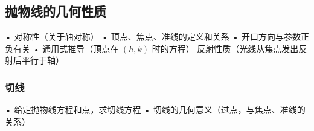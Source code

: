 \subsection{抛物线的几何性质}
	•	对称性（关于轴对称）
	•	顶点、焦点、准线的定义和关系
	•	开口方向与参数正负有关
	•	通用式推导（顶点在 $(h,k)$ 时的方程）
    反射性质（光线从焦点发出反射后平行于轴）
\subsubsection{切线}
	•	给定抛物线方程和点，求切线方程
	•	切线的几何意义（过点，与焦点、准线的关系）
